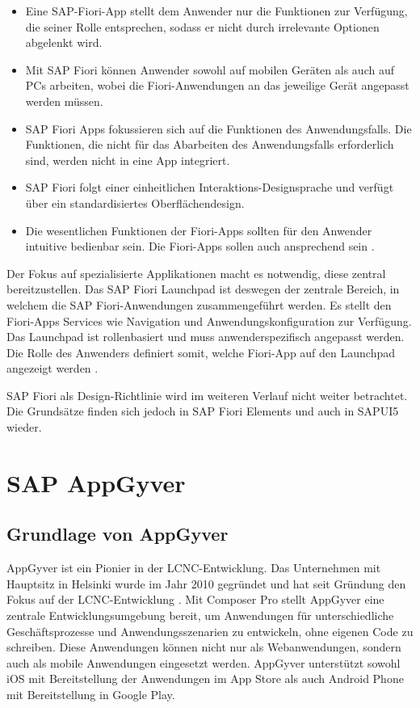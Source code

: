 \begin{itemize}[noitemsep]
\item Eine SAP-Fiori-App stellt dem Anwender nur die Funktionen zur Verfügung, die seiner Rolle entsprechen, sodass er nicht durch irrelevante Optionen abgelenkt wird.
\item Mit SAP Fiori können Anwender sowohl auf mobilen Geräten als auch auf PCs arbeiten, wobei die Fiori-Anwendungen an das jeweilige Gerät angepasst werden müssen.
\item SAP Fiori Apps fokussieren sich auf die Funktionen des Anwendungsfalls. Die Funktionen, die nicht für das Abarbeiten des Anwendungsfalls erforderlich sind, werden nicht in eine App integriert.
\item SAP Fiori folgt einer einheitlichen Interaktions-Designsprache und verfügt über ein standardisiertes Oberflächendesign.
\item Die wesentlichen Funktionen der Fiori-Apps sollten für den Anwender intuitive bedienbar sein. Die Fiori-Apps sollen auch ansprechend sein \cite[S.34-35]{fiori}.
\end{itemize}

Der Fokus auf spezialisierte Applikationen macht es notwendig, diese zentral bereitzustellen. Das SAP Fiori Launchpad ist deswegen der zentrale Bereich, in welchem die SAP Fiori-Anwendungen zusammengeführt werden. Es stellt den Fiori-Apps Services wie Navigation und Anwendungskonfiguration zur Verfügung. Das Launchpad ist rollenbasiert und muss anwenderspezifisch angepasst werden. Die Rolle des Anwenders definiert somit, welche Fiori-App auf den Launchpad angezeigt werden \cite{sap:fiorilp}.

SAP Fiori als Design-Richtlinie wird im weiteren Verlauf nicht weiter betrachtet. Die Grundsätze finden sich jedoch in SAP Fiori Elements und auch in SAPUI5 wieder.

\section{SAP AppGyver }
\subsection{Grundlage von AppGyver}

AppGyver ist ein Pionier in der LCNC-Entwicklung. Das Unternehmen mit Hauptsitz in Helsinki wurde im Jahr 2010 gegründet und hat seit Gründung den Fokus auf der LCNC-Entwicklung \cite{sap:lcnc}. Mit Composer Pro stellt AppGyver eine zentrale Entwicklungsumgebung bereit, um Anwendungen für unterschiedliche Geschäftsprozesse und Anwendungsszenarien zu entwickeln, ohne eigenen Code zu schreiben. Diese Anwendungen können nicht nur als Webanwendungen, sondern auch als mobile Anwendungen eingesetzt werden. AppGyver unterstützt sowohl iOS mit Bereitstellung der Anwendungen im App Store als auch Android Phone mit Bereitstellung in Google Play. 

